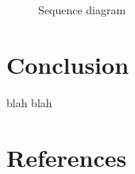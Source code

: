\documentclass[review]{elsarticle}
\begin{document}
\begin{figure}[p]
    \vspace*{-2cm}
    \caption{Sequence diagram}
    \label{genera}
\end{figure}


\section{Conclusion}

blah blah



\section*{References}


\end{document}
